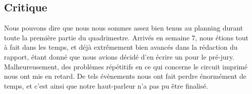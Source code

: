 \subsection{Critique} Nous pouvons dire que nous nous sommes assez bien tenus au planning durant toute la 
première partie du quadrimestre. Arrivés en semaine 7, nous étions tout à fait dans les temps, et déjà 
extrêmement bien avancés dans la rédaction du rapport, étant donné que nous avions décidé d'en écrire un 
pour le pré-jury. Malheureusement, des problèmes répétitifs en ce qui concerne le circuit imprimé nous ont
mis en retard. De tels évènements nous ont fait perdre énormément de temps, et c'est ainsi que notre 
haut-parleur n'a pas pu être finalisé.


